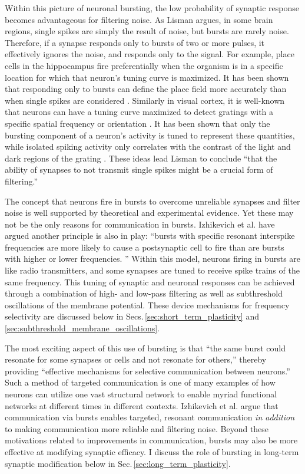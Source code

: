 Within this picture of neuronal bursting, the low probability of synaptic response becomes advantageous for filtering noise. As Lisman argues, in some brain regions, single spikes are simply the result of noise, but bursts are rarely noise. Therefore, if a synapse responds only to bursts of two or more pulses, it effectively ignores the noise, and responds only to the signal. For example, place cells in the hippocampus \cite{frbu2018} fire preferentially when the organism is in a specific location for which that neuron's tuning curve is maximized. It has been shown that responding only to bursts can define the place field more accurately than when single spikes are considered \cite{otei1991}. Similarly in visual cortex, it is well-known that neurons can have a tuning curve maximized to detect gratings with a specific spatial frequency or orientation \cite{daab2001}. It has been shown that only the bursting component of a neuron's activity is tuned to represent these quantities, while isolated spiking activity only correlates with the contrast of the light and dark regions of the grating \cite{cama1981}. These ideas lead Lisman to conclude ``that the ability of synapses to not transmit single spikes might be a crucial form of filtering.'' \cite{li1997} 

The concept that neurons fire in bursts to overcome unreliable synapses and filter noise is well supported by theoretical and experimental evidence. Yet these may not be the only reasons for communication in bursts. Izhikevich et al. have argued another principle is also in play: ``bursts with specific resonant interspike frequencies are more likely to cause a postsynaptic cell to fire than are bursts with higher or lower frequencies. '' \cite{izde2003} Within this model, neurons firing in bursts are like radio transmitters, and some synapses are tuned to receive spike trains of the same frequency. This tuning of synaptic and neuronal responses can be achieved through a combination of high- and low-pass filtering as well as subthreshold oscillations of the membrane potential. These device mechanisms for frequency selectivity are discussed below in Secs.\,\ref{sec:short_term_plasticity} and \ref{sec:subthreshold_membrane_oscillations}. 

The most exciting aspect of this use of bursting is that ``the same burst could resonate for some synapses or cells and not resonate for others,'' thereby providing ``effective mechanisms for selective communication between neurons.'' Such a method of targeted communication is one of many examples of how neurons can utilize one vast structural network to enable myriad functional networks at different times in different contexts. Izhikevich et al. argue that communication via bursts enables targeted, resonant communication \textit{in addition} to making communication more reliable and filtering noise. Beyond these motivations related to improvements in communication, bursts may also be more effective at modifying synaptic efficacy. I discuss the role of bursting in long-term synaptic modification below in Sec.\,\ref{sec:long_term_plasticity}.

